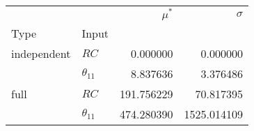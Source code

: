\begin{tabular}{llrr}
\toprule
     &               &  $\mu^\ast$ &     $\sigma$ \\
Type & Input &             &              \\
\midrule
independent & $RC$ &    0.000000 &     0.000000 \\
     & $\theta_{11}$ &    8.837636 &     3.376486 \\
full & $RC$ &  191.756229 &    70.817395 \\
     & $\theta_{11}$ &  474.280390 &  1525.014109 \\
\bottomrule
\end{tabular}
